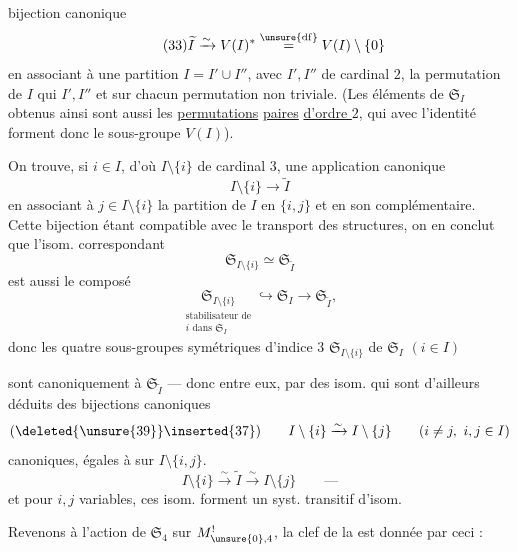 
bijection canonique
\[
\tag{33}
\widetilde I \xrightarrow{\sim} V(I)^*
\overset{\unsure{\mathrm{df}}}{=} V(I)\setminus\{0\}
\]
en associant à une partition $I=I'\cup I''$, avec
$I',I''$ de cardinal $2$, la  permutation
 de $I$
 qui  $I',I''$ et  sur
chacun  permutation non triviale. (Les éléments
de $\mathfrak{S}_I$ obtenus ainsi sont aussi les \uline{permutations}
\uline{paires} \uline{d'ordre $2$}, \deleted{\unsure{)}} qui avec l'identité forment
donc le sous-groupe $V(I)$).

On trouve, si $i\in I$, d'où $I\setminus\{i\}$ de
cardinal $3$,  une application canonique
\[
\tag{34}
I\setminus\{i\}\longrightarrow\widetilde I
\]
en associant à $j\in I\setminus\{i\}$ la partition
de $I$ en $\{i,j\}$ et en son complémentaire.
Cette bijection étant compatible avec le
transport des structures, on en conclut
que l'isom. correspondant
\[
\tag{35}
\mathfrak{S}_{I\setminus\{i\}}\simeq\mathfrak{S}_{\widetilde I}
\]
 est  aussi le composé
\[
\tag{36}
\underset{\substack{\text{stabilisateur de}\\ i\text{ dans }\mathfrak{S}_I}}
{\mathfrak{S}_{I\setminus\{i\}}}
\hookrightarrow\mathfrak{S}_I\longrightarrow\mathfrak{S}_{\widetilde I},
\]
donc les quatre sous-groupes symétriques
d'indice $3$ $\mathfrak{S}_{I\setminus\{i\}}$ de $\mathfrak{S}_I$ $(i\in I)$

sont canoniquement  à $\mathfrak{S}_{\widetilde I}$
--- donc entre eux,  par des isom. qui
 sont  d'ailleurs  déduits des bijections
canoniques 
\[
  (\deleted{\unsure{39}}\inserted{37})\qquad
  I\setminus\{i\}\xrightarrow{\sim}I\setminus\{j\}
  \qquad(i\ne j,\ i,j\in I)
\]
canoniques, égales à 
 sur $I\setminus\{i,j\}$.
\[
  I\setminus\{i\}\xrightarrow{\sim}\widetilde I
  \xrightarrow{\sim}I\setminus\{j\}
  \qquad\text{---}
\]
et pour $i,j$ variables, ces isom. forment un
syst. transitif d'isom.

Revenons à l'action de $\mathfrak{S}_4$ sur
$M_{\unsure{0},4}^{!}$, la clef de la 
est donnée par ceci :

